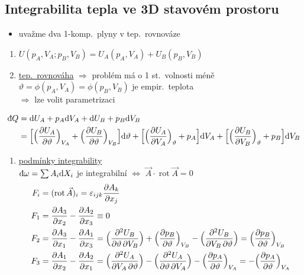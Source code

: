 \subsection*{Integrabilita tepla ve 3D stavovém prostoru}
\begin{itemize}
  \item uvažme dva 1-komp.\ plyny v tep.\ rovnováze
\end{itemize}
\begin{enumerate}[label=\alph*)]
  \item $U(p_A,V_A;p_B,V_B) = U_A(p_A,V_A) + U_B(p_B,V_B)$
  \item \underline{tep.\ rovnováha} $\Rightarrow$ problém má o 1 st.\ volnosti méně \\
  \quad $\vartheta = \phi(p_A,V_A) = \phi(p_B,V_B)$ \quad je empir.\ teplota \\
  \quad $\Rightarrow$ lze volit parametrizaci 
\end{enumerate}
\begin{align*}
  \dbar Q &= \dd U_A + p_A\dd V_A + \dd U_B + p_B\dd V_B \\
  &= \Big[\Big(\pdv{U_A}{\vartheta}\Big)_{V_A} + \Big(\pdv{U_B}{\vartheta}\Big)_{V_B}\Big]\dd\vartheta
   + \Big[\Big(\pdv{U_A}{V_A}\Big)_\vartheta + p_A\Big]\dd V_A
   + \Big[\Big(\pdv{U_B}{V_B}\Big)_\vartheta + p_B\Big]\dd V_B
\end{align*}
\begin{enumerate}[label=\alph*),start=3]
  \item \underline{podmínky integrability} \\
  $\dbar\omega = \sum A_i\dd X_i$ je integrabilní $\Leftrightarrow$ $\vec A\cdot\operatorname{rot}\vec A = 0$
  \begin{align*}
    F_i &= (\operatorname{rot}\vec A)_i = \varepsilon_{ijk}\pdv{A_k}{x_j} \\
    F_1 &= \pdv{A_3}{x_2} - \pdv{A_2}{x_3} \equiv 0 \\
    F_2 &= \pdv{A_3}{x_1} - \pdv{A_1}{x_3} = \Big(\frac{\partial^2U_B}{\partial\vartheta\,\partial V_B}\Big) + \Big(\pdv{p_B}{\vartheta}\Big)_{V_B} - \Big(\frac{\partial^2U_B}{\partial V_B\,\partial\vartheta}\Big) = \Big(\pdv{p_B}{\vartheta}\Big)_{V_B} \\
    F_3 &= \pdv{A_1}{x_2} - \pdv{A_2}{x_1} = \Big(\frac{\partial^2U_A}{\partial V_A\,\partial\vartheta}\Big) - \Big(\frac{\partial^2U_A}{\partial\vartheta\,\partial V_A}\Big) - \Big(\pdv{p_A}{\vartheta}\Big)_{V_A} = -\Big(\pdv{p_A}{\vartheta}\Big)_{V_A}
  \end{align*}
\end{enumerate}
